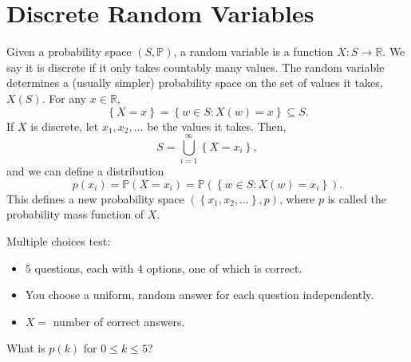 \chapter{Discrete Random Variables}

\begin{definition}
    Given a probability space \((S, \mathbb{P} )\), a random variable is a function \(X: S \to \mathbb{R} \). We say it is discrete if it only takes countably many values. The random variable determines a (usually simpler) probability space on the set of values it takes, \(X(S)\). For any \(x \in \mathbb{R} \),
    \[
        \left\{ X = x \right\} = \left\{ w \in S: X(w) = x \right\}  \subseteq S .
    \] 
    If \(X\) is discrete, let \(x_1, x_2, \dots \) be the values it takes. Then, 
    \[
        S = \bigcup_{i=1}^{\infty} \left\{ X = x_i \right\},  
    \]     
    and we can define a distribution 
    \[
        p(x_i) = \mathbb{P} (X = x_i) = \mathbb{P} (\left\{ w \in S: X(w) = x_i \right\} ).
    \]
    This defines a new probability space \((\left\{ x_1, x_2, \dots \right\}, p )\), where \(p\) is called the probability mass function of \(X\).   
\end{definition}

\begin{eg}
    Multiple choices test:
    \begin{itemize}
        \item \(5\) questions, each with \(4\) options, one of which is correct. 
        \item You choose a uniform, random answer for each question independently. 
        \item \(X=\) number of correct answers.  
    \end{itemize}
    What is \(p(k)\) for \(0 \leq k \leq 5\)?  
\end{eg}

